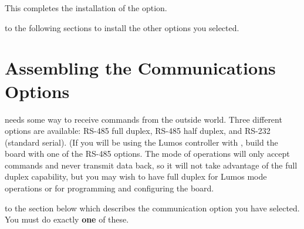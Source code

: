 \documentclass[letterpaper,twoside,onecolumn,openright,final]{memoir}
\begin{document}
This completes the installation of the  option.  

\bigskip

 to the following sections
to install the other options you selected.

\chapter{Assembling the Communications Options}\label{ch:comms}
 needs some way to receive commands from the outside
world.  Three different options are available: RS-485 full duplex, RS-485 half duplex, and RS-232
(standard serial).  (If you will be using the Lumos controller with , build the
board with one of the RS-485 options.  The  mode of operations will only 
accept commands and never transmit data back, so it will not take advantage
of the full duplex capability, but you may wish to have full duplex for Lumos mode operations
or for programming and configuring the board.

\bigskip

 to the section below which describes the communication option
you have selected.  You must do exactly {\bfseries one} of these.
\end{document}

